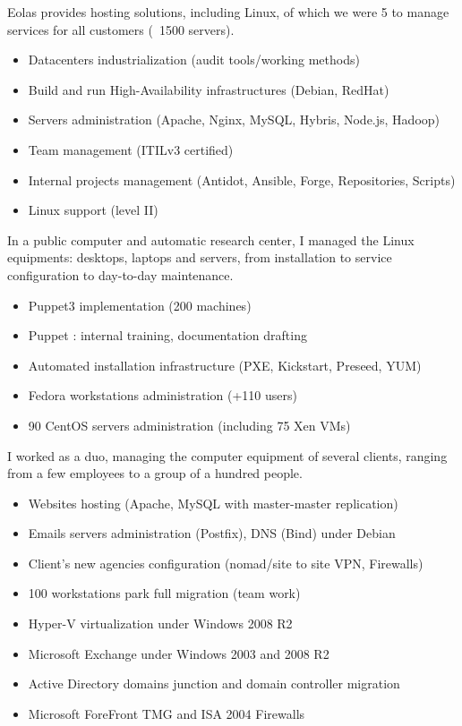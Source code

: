 \documentclass[12pt,a4paper,roman]{moderncv}          %
\begin{document}
{Eolas provides hosting solutions, including Linux, of which we were 5 to manage services for all customers (~1500 servers).
\begin{itemize}
  \item Datacenters industrialization (audit tools/working methods)
  \item Build and run High-Availability infrastructures (Debian, RedHat)
  \item Servers administration (Apache, Nginx, MySQL, Hybris, Node.js, Hadoop)
  \item Team management (ITILv3 certified)
  \item Internal projects management (Antidot, Ansible, Forge, Repositories, Scripts)
  \item Linux support (level II)
\end{itemize}}


{In a public computer and automatic research center, I managed the Linux equipments: desktops, laptops and servers, from installation to service configuration to day-to-day maintenance.
\begin{itemize}
  \item Puppet3 implementation (200 machines)
  \item Puppet : internal training, documentation drafting
  \item Automated installation infrastructure (PXE, Kickstart, Preseed, YUM)
  \item Fedora workstations administration (+110 users)
  \item 90 CentOS servers administration (including 75 Xen VMs)
\end{itemize}}


{I worked as a duo, managing the computer equipment of several clients, ranging from a few employees to a group of a hundred people.
\begin{itemize}
  \item Websites hosting (Apache, MySQL with master-master replication)
  \item Emails servers administration (Postfix), DNS (Bind) under Debian
  \item Client's new agencies configuration (nomad/site to site VPN, Firewalls)
  \item 100 workstations park full migration (team work)
  \item Hyper-V virtualization under Windows 2008 R2
  \item Microsoft Exchange under Windows 2003 and 2008 R2
  \item Active Directory domains junction and domain controller migration
  \item Microsoft ForeFront TMG and ISA 2004 Firewalls
\end{itemize}}
\end{document}
